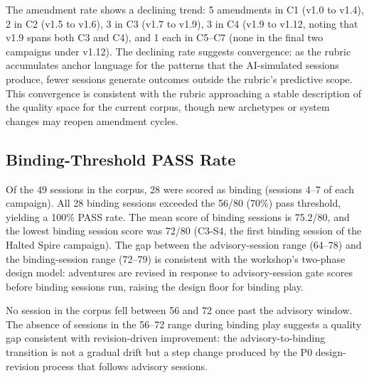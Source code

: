 The amendment rate shows a declining trend: 5 amendments in C1 (v1.0 to v1.4), 2 in
C2 (v1.5 to v1.6), 3 in C3 (v1.7 to v1.9), 3 in C4 (v1.9 to v1.12, noting that v1.9
spans both C3 and C4), and 1 each in C5--C7 (none in the final two campaigns under
v1.12). The declining rate suggests convergence: as the rubric accumulates anchor
language for the patterns that the AI-simulated sessions produce, fewer sessions
generate outcomes outside the rubric's predictive scope. This convergence is consistent
with the rubric approaching a stable description of the quality space for the current
corpus, though new archetypes or system changes may reopen amendment cycles.

\subsection{Binding-Threshold PASS Rate}

Of the 49 sessions in the corpus, 28 were scored as binding (sessions 4--7 of each
campaign). All 28 binding sessions exceeded the 56/80 (70\%) pass threshold, yielding
a 100\% PASS rate. The mean score of binding sessions is 75.2/80, and the lowest
binding session score was 72/80 (C3-S4, the first binding session of the Halted Spire
campaign). The gap between the advisory-session range (64--78) and the binding-session
range (72--79) is consistent with the workshop's two-phase design model: adventures
are revised in response to advisory-session gate scores before binding sessions run,
raising the design floor for binding play.

No session in the corpus fell between 56 and 72 once past the advisory window. The
absence of sessions in the 56--72 range during binding play suggests a quality gap
consistent with revision-driven improvement: the advisory-to-binding transition is not
a gradual drift but a step change produced by the P0 design-revision process that
follows advisory sessions.
